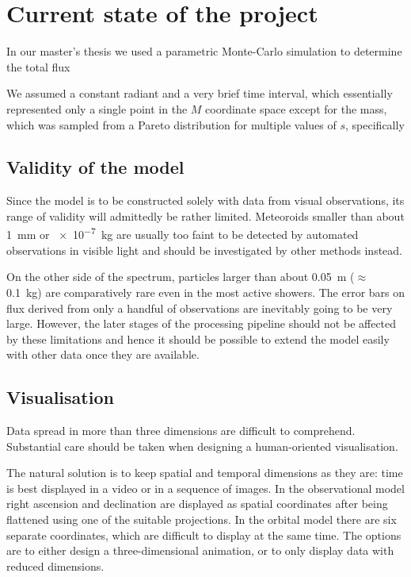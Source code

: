 \section{Current state of the project} \label{pc}
    In our master's thesis \citep{balaz-thesis} we used a parametric Monte-Carlo simulation
    to determine the total flux 

    We assumed a constant radiant and a very brief time interval,
    which essentially represented only a single point in the $M$ coordinate space
    except for the mass, which was sampled from a Pareto distribution for multiple values of $s$,
    specifically


    \subsection{Validity of the model} \label{iav}
        Since the model is to be constructed solely with data from visual observations,
        its range of validity will admittedly be rather limited.
        Meteoroids smaller than about \SI{1}{\milli\metre} or \SI{e-7}{\kilo\gram} are usually too faint
        to be detected by automated observations in visible light and should be investigated
        by other methods instead.

        On the other side of the spectrum, particles larger than about \SI{0.05}{\metre} ($\approx$ \SI{0.1}{\kilo\gram})
        are comparatively rare even in the most active showers.
        The error bars on flux derived from only a handful of observations are inevitably going to be very large.
        However, the later stages of the processing pipeline should not be affected by these limitations
        and hence it should be possible to extend the model easily with other data once they are available.

    \subsection{Visualisation} \label{iov}
        Data spread in more than three dimensions are difficult to comprehend.
        Substantial care should be taken when designing a human-oriented visualisation.

        The natural solution is to keep spatial and temporal dimensions as they are:
        time is best displayed in a video or in a sequence of images.
        In the observational model right ascension and declination are displayed as spatial coordinates after being
        flattened using one of the suitable projections.
        In the orbital model there are six separate coordinates, which are difficult to display at the same time.
        The options are to either design a three-dimensional animation, or to only display data with reduced dimensions.

